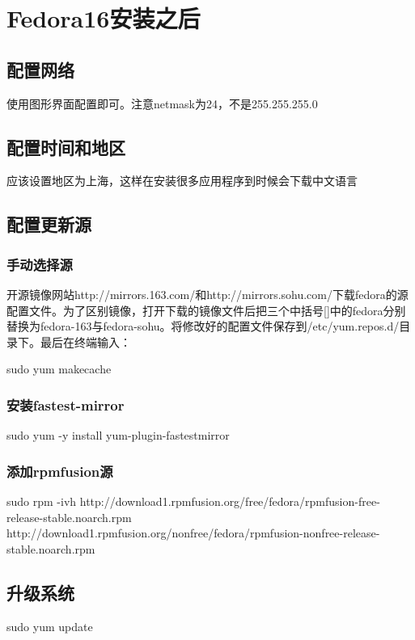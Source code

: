 \newpage
\section{Fedora16安装之后}
\subsection{配置网络}
使用图形界面配置即可。注意netmask为24，不是255.255.255.0
\subsection{配置时间和地区}
应该设置地区为上海，这样在安装很多应用程序到时候会下载中文语言
\subsection{配置更新源}
\subsubsection{手动选择源}
开源镜像网站http://mirrors.163.com/和http://mirrors.sohu.com/下载fedora的源配置文件。为了区别镜像，打开下载的镜像文件后把三个中括号[]中的fedora分别替换为fedora-163与fedora-sohu。将修改好的配置文件保存到/etc/yum.repos.d/目录下。最后在终端输入：
\begin{shellcmd}
sudo yum makecache
\end{shellcmd}

\subsubsection{安装fastest-mirror}
\begin{shellcmd}
sudo yum -y install yum-plugin-fastestmirror 
\end{shellcmd}
\subsubsection{添加rpmfusion源}
\begin{shellcmd}
sudo rpm -ivh http://download1.rpmfusion.org/free/fedora/rpmfusion-free-release-stable.noarch.rpm 
http://download1.rpmfusion.org/nonfree/fedora/rpmfusion-nonfree-release-stable.noarch.rpm
\end{shellcmd}

\subsection{升级系统}
\begin{shellcmd}
sudo yum update
\end{shellcmd}

